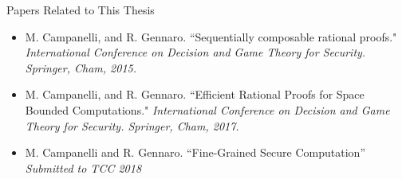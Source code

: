 \begin{frame}{Papers Related to This Thesis}
\begin{itemize}
	\item M. Campanelli, and R. Gennaro. ``Sequentially composable rational proofs." \textit{International Conference on Decision and Game Theory for Security. Springer, Cham, 2015.}
	\item M. Campanelli, and R. Gennaro. ``Efficient Rational Proofs for Space Bounded Computations." \textit{International Conference on Decision and Game Theory for Security. Springer, Cham, 2017.}
	\item M. Campanelli and R. Gennaro. ``Fine-Grained Secure Computation'' \textit{Submitted to TCC 2018}
\end{itemize}
\end{frame}


